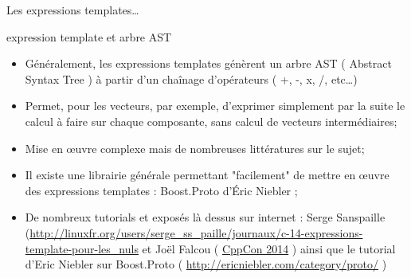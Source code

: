 \documentclass[compress,10pt,aspectratio=169]{beamer}
\begin{document}
  \begin{frame}[fragile]{Les expressions templates\ldots}
    \scriptsize
  \begin{block}{\small expression template et arbre AST}
  \begin{itemize}
  \item Généralement, les expressions templates génèrent un arbre AST ( Abstract Syntax Tree ) à partir d'un chaînage d'opérateurs ( +, -, x, /, etc\ldots )
  \item Permet, pour les vecteurs, par exemple, d'exprimer simplement par la suite le calcul à faire sur chaque composante, sans calcul de vecteurs intermédiaires;
  \item Mise en {\oe}uvre complexe mais de nombreuses littératures sur le sujet;
  \item Il existe une librairie générale permettant "facilement" de mettre en {\oe}uvre des expressions templates : Boost.Proto d'\'Eric Niebler ;
  \item De nombreux tutorials et exposés là dessus sur internet : Serge Sanspaille (\url{http://linuxfr.org/users/serge_ss_paille/journaux/c-14-expressions-template-pour-les_nuls} et Joël Falcou ( \href{https://www.google.fr/url?sa=t&source=web&rct=j&url=https://www.youtube.com/watch%3Fv%3DIiVl5oSU5B8&ved=0ahUKEwiDlZeHlffWAhXEORoKHaRvAiMQwqsBCCEwAA&usg=AOvVaw1SAydGHQAXoJVZ-RdvW1TT}{CppCon 2014} ) ainsi que le tutorial d'Eric Niebler sur Boost.Proto ( \url{http://ericniebler.com/category/proto/} )
  \end{itemize}
  \end{block}
  \end{frame}
  
  
\end{document}
